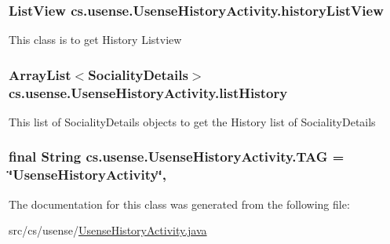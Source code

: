 \subsubsection[{history\+List\+View}]{\setlength{\rightskip}{0pt plus 5cm}List\+View cs.\+usense.\+Usense\+History\+Activity.\+history\+List\+View\hspace{0.3cm}{\ttfamily [private]}}\label{classcs_1_1usense_1_1_usense_history_activity_acd16e092197c435f5f934ef0b35a90ff}
This class is to get History Listview \hypertarget{classcs_1_1usense_1_1_usense_history_activity_a2fc0107cef126d33f21bf69fd05b618f}{}
\subsubsection[{list\+History}]{\setlength{\rightskip}{0pt plus 5cm}Array\+List$<${\bf Sociality\+Details}$>$ cs.\+usense.\+Usense\+History\+Activity.\+list\+History\hspace{0.3cm}{\ttfamily [static]}}\label{classcs_1_1usense_1_1_usense_history_activity_a2fc0107cef126d33f21bf69fd05b618f}
This list of Sociality\+Details objects to get the History list of Sociality\+Details \hypertarget{classcs_1_1usense_1_1_usense_history_activity_a714a831ec36255d86ff5dd1adc9fdb74}{}
\subsubsection[{T\+A\+G}]{\setlength{\rightskip}{0pt plus 5cm}final String cs.\+usense.\+Usense\+History\+Activity.\+T\+A\+G = \char`\"{}Usense\+History\+Activity\char`\"{}\hspace{0.3cm}{\ttfamily [static]}, {\ttfamily [private]}}\label{classcs_1_1usense_1_1_usense_history_activity_a714a831ec36255d86ff5dd1adc9fdb74}


The documentation for this class was generated from the following file\+:\begin{DoxyCompactItemize}
\item 
src/cs/usense/\hyperlink{_usense_history_activity_8java}{Usense\+History\+Activity.\+java}\end{DoxyCompactItemize}
